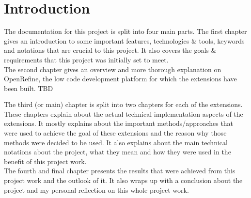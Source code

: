 \chapter{Introduction}\label{ch:introduction}
The documentation for this project is split into four main parts.
The first chapter gives an introduction to some important features, technologies \& tools, keywords and notations that are crucial to this project.
It also covers the goals \& requirements that this project was initially set to meet.\\
\newline
The second chapter gives an overview and more thorough explanation on OpenRefine, the low code development platform for which the extensions have been built. TBD\\
\newline

The third (or main) chapter is split into two chapters for each of the extensions. These chapters explain about the actual technical implementation aspects of the extensions.
It mostly explains about the important methods/approaches that were used to achieve the goal of these extensions and the reason why those methods were decided to be used.
It also explains about the main technical notations about the project, what they mean and how they were used in the benefit of this project work.\\
\newline
The fourth and final chapter presents the results that were achieved from this project work and the outlook of it.
It also wraps up with a conclusion about the project and my personal reflection on this whole project work.
\newpage
